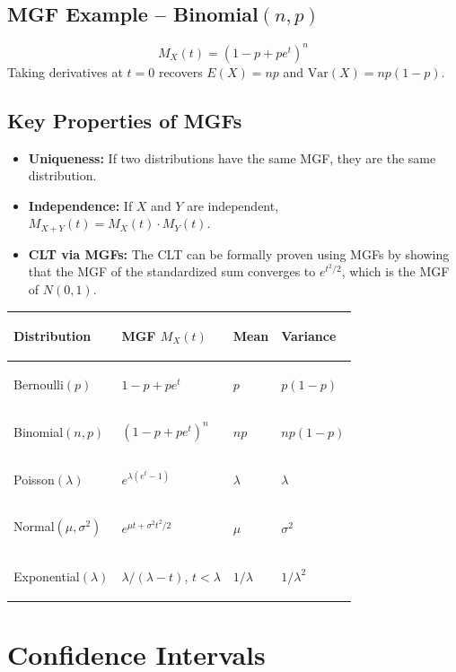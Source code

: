 \documentclass[11pt, letterpaper]{article}
\begin{document}
\subsection*{MGF Example -- Binomial$(n,p)$}
\[
  M_X(t) = \left(1 - p + pe^t\right)^n
\]
Taking derivatives at $t=0$ recovers $E(X) = np$ and $\text{Var}(X) = np(1-p)$.

\subsection*{Key Properties of MGFs}
\begin{itemize}[noitemsep]
  \item \textbf{Uniqueness:} If two distributions have the same MGF, they are the same distribution.
  \item \textbf{Independence:} If $X$ and $Y$ are independent, $M_{X+Y}(t) = M_X(t) \cdot M_Y(t)$.
  \item \textbf{CLT via MGFs:} The CLT can be formally proven using MGFs by showing that the MGF of the standardized sum converges to $e^{t^2/2}$, which is the MGF of $N(0,1)$.
\end{itemize}

\noindent
{\renewcommand{\arraystretch}{1.6}
\begin{tabularx}{\textwidth}{>{\bfseries\raggedright\arraybackslash}p{3.2cm}
                              >{\raggedright\arraybackslash}X
                              >{\centering\arraybackslash}p{1.8cm}
                              >{\centering\arraybackslash}p{1.8cm}}
\toprule
\rowcolor{tableheaderteal}
\textbf{Distribution} & \textbf{MGF $M_X(t)$} & \textbf{Mean} & \textbf{Variance} \\
\midrule
\rowcolor{rowTe} Bernoulli$(p)$     & $1-p+pe^t$ & $p$ & $p(1-p)$ \\
\rowcolor{rowA}  Binomial$(n,p)$    & $(1-p+pe^t)^n$ & $np$ & $np(1-p)$ \\
\rowcolor{rowTe} Poisson$(\lambda)$ & $e^{\lambda(e^t - 1)}$ & $\lambda$ & $\lambda$ \\
\rowcolor{rowA}  Normal$(\mu,\sigma^2)$ & $e^{\mu t + \sigma^2 t^2/2}$ & $\mu$ & $\sigma^2$ \\
\rowcolor{rowTe} Exponential$(\lambda)$ & $\lambda/(\lambda - t)$, $t < \lambda$ & $1/\lambda$ & $1/\lambda^2$ \\
\bottomrule
\end{tabularx}}

\section*{Confidence Intervals}
\end{document}
